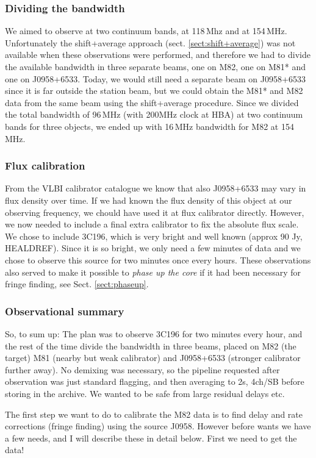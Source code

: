 \subsubsection{Dividing the bandwidth}
We aimed to observe at two continuum bands, at 118\,Mhz and at 154\,MHz.
Unfortunately the shift+average approach (sect. \ref{sect:shift+average}) was not
available when these observations were performed, and therefore we 
had to divide the available bandwidth in three separate beams, one on M82, one
on M81* and one on J0958+6533. Today, we would still need a separate beam
on J0958+6533 since it is far outside the station beam, but we could obtain
the M81* and M82 data from the same beam using the shift+average procedure.
Since we divided the total bandwidth of 96\,MHz (with 200MHz clock at HBA) 
at two continuum bands for three objects, 
we ended up with 16\,MHz bandwidth for M82 at 154\,MHz. 

\subsubsection{Flux calibration}
From the VLBI calibrator catalogue we know that also J0958+6533 may vary in
flux density over time. If we had known the flux density
of this object at our observing frequency, we chould have used it at flux
calibrator directly.  However, we now needed to include a final extra
calibrator to fix the absolute flux scale. We chose to include 3C196, which is
very bright and well known (approx 90 Jy, HEALDREF). Since it is so bright,
we only need a few minutes of data and we chose to observe this source 
for two minutes once every hours. These observations also served to 
make it possible to \emph{phase up the core} if it had been necessary for 
fringe finding, see Sect. \ref{sect:phaseup}.

\subsubsection{Observational summary}
So, to sum up: The plan was to observe 3C196 for two minutes every hour, and 
the rest of the time divide the bandwidth in three beams, placed on M82 (the target)
M81 (nearby but weak calibrator) and J0958+6533 (stronger calibrator further away).
No demixing was necessary, so the pipeline requested after observation was just 
standard flagging, and then averaging to 2s, 4ch/SB before storing in the archive.
We wanted to be safe from large residual delays etc.

The first step we want to do to calibrate the M82 data is to find delay and rate corrections
(fringe finding) using the source J0958. However before wants we have a few needs, 
and I will describe these in detail below. First we need to get the data!

